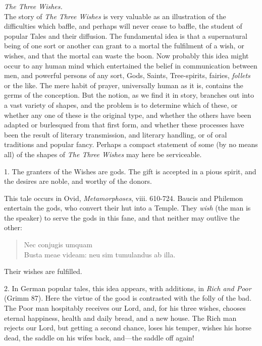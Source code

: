 \documentclass[14pt,a4paper]{memoir}
\begin{document}
{\emph{The Three Wishes.} \\

The story of \emph{The Three Wishes} is very valuable as an illustration
of the difficulties which baffle, and perhaps will never cease to
baffle, the student of popular Tales and their diffusion. The
fundamental idea is that a supernatural being of one sort or another can
grant to a mortal the fulfilment of a wish, or wishes, and that the
mortal can waste the boon. Now probably this idea might occur to any
human mind which entertained the belief in communication between men,
and powerful persons of any sort, Gods, Saints, Tree-spirits, fairies,
\emph{follets} or the like. The mere habit of prayer, universally human
as it is, contains the germs of the conception. But the notion, as we
find it in story, branches out into a vast variety of shapes, and the
problem is to determine which of these, or whether any one of these is
the original type, and whether the others have been adapted or
burlesqued from that first form, and whether these processes have been
the result of literary transmission, and literary handling, or of oral
traditions and popular fancy. Perhaps a compact statement of some (by no
means all) of the shapes of \emph{The Three Wishes} may here be
serviceable.

1. The granters of the Wishes are gods. The gift is accepted in a pious
spirit, and the desires are noble, and worthy of the donors.

This tale occurs in Ovid, \emph{Metamorphoses}, viii. 610-724. Baucis
and Philemon entertain the gods, who convert their hut into a Temple.
They \emph{wish} (the man is the speaker) to serve the gods in this
fane, and that neither may outlive the other:

\begin{verse}
\small
\vin\vin \foreignlanguage{latin}{Nec conjugis umquam \\
Busta meae videam: neu sim tumulandus ab illa.}
\end{verse}

Their wishes are fulfilled.

2. In German popular tales, this idea appears, with additions, in
\emph{Rich and Poor} (Grimm 87). Here the virtue of the good is
contrasted with the folly of the bad. The Poor man hospitably receives
our Lord, and, for his three wishes, chooses eternal happiness, health
and daily bread, and a new house. The Rich man rejects our Lord, but
getting a second chance, loses his temper, wishes his horse dead, the
saddle on his wife\textquotesingle s back, and---the saddle off again!

}
\end{document}
